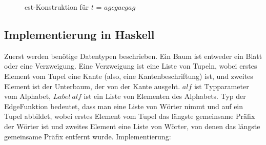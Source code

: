 \documentclass[12pt]{report}
\begin{document}
\begin{figure}[h]
\medskip
\caption{cst-Konstruktion für $t$ = $agcgacgag$}
\label{fig:cstKonstruktion}
\end{figure}


\subsection{Implementierung in Haskell}
\label{sec:ImplementierungInHaskell}

Zuerst werden benötige Datentypen beschrieben. Ein Baum ist entweder ein Blatt oder eine Verzweigung. Eine Verzweigung ist eine Liste von Tupeln, wobei erstes Element vom Tupel eine Kante (also, eine Kantenbeschriftung) ist, und zweites Element ist der Unterbaum, der von der Kante ausgeht. $alf$ ist Typparameter vom Alphabet, $Label\:alf$ ist ein Liste von Elementen des Alphabets.
Typ der EdgeFunktion bedeutet, dass man eine Liste von Wörter nimmt und auf ein Tupel abbildet, wobei erstes Element vom Tupel das längste gemeinsame Präfix der Wörter ist und zweites Element eine Liste von Wörter, von denen das längste gemeinsame Präfix entfernt wurde. Implementierung:
\end{document}
